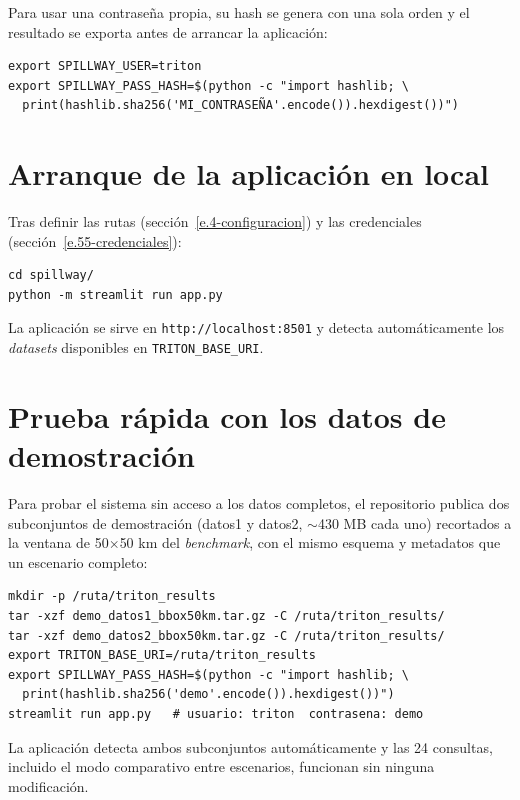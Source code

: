 Para usar una contraseña propia, su hash se genera con una sola orden y el resultado se exporta antes de arrancar la aplicación:

\begin{verbatim}
export SPILLWAY_USER=triton
export SPILLWAY_PASS_HASH=$(python -c "import hashlib; \
  print(hashlib.sha256('MI_CONTRASEÑA'.encode()).hexdigest())")
\end{verbatim}

\section{Arranque de la aplicación en local}\label{e.6-app-local}

Tras definir las rutas (sección~\ref{e.4-configuracion}) y las credenciales (sección~\ref{e.55-credenciales}):

\begin{verbatim}
cd spillway/
python -m streamlit run app.py
\end{verbatim}

La aplicación se sirve en \texttt{http://localhost:8501} y detecta automáticamente los \textit{datasets} disponibles en \texttt{TRITON\_BASE\_URI}.

\section{Prueba rápida con los datos de demostración}\label{e.7-prueba-rapida}

Para probar el sistema sin acceso a los datos completos, el repositorio publica dos subconjuntos de demostración (datos1 y datos2, $\sim$430 MB cada uno) recortados a la ventana de 50$\times$50 km del \textit{benchmark}, con el mismo esquema y metadatos que un escenario completo:

\begin{verbatim}
mkdir -p /ruta/triton_results
tar -xzf demo_datos1_bbox50km.tar.gz -C /ruta/triton_results/
tar -xzf demo_datos2_bbox50km.tar.gz -C /ruta/triton_results/
export TRITON_BASE_URI=/ruta/triton_results
export SPILLWAY_PASS_HASH=$(python -c "import hashlib; \
  print(hashlib.sha256('demo'.encode()).hexdigest())")
streamlit run app.py   # usuario: triton  contrasena: demo
\end{verbatim}

La aplicación detecta ambos subconjuntos automáticamente y las 24 consultas, incluido el modo comparativo entre escenarios, funcionan sin ninguna modificación.

